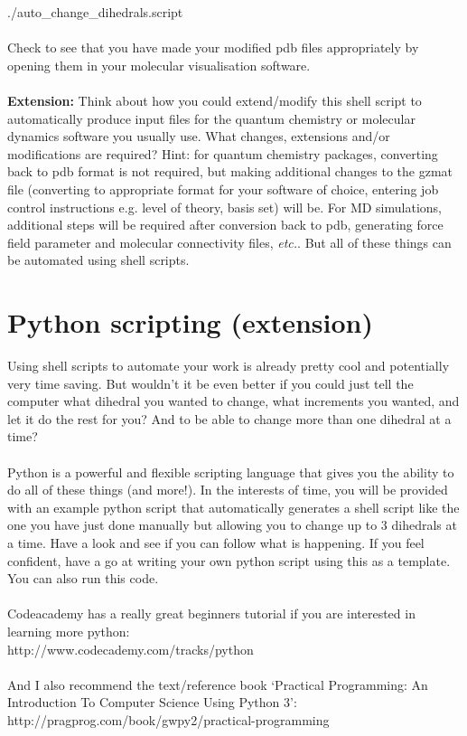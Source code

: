 \documentclass{article}
\begin{document}
./auto\_change\_dihedrals.script\\
\\
Check to see that you have made your modified pdb files appropriately by opening them in your molecular visualisation software.\\
\\
\noindent
\textbf{Extension:} Think about how you could extend/modify this shell script to automatically produce input files for the quantum chemistry or molecular dynamics software you usually use. What changes, extensions and/or modifications are required? Hint: for quantum chemistry packages, converting back to pdb format is not required, but making additional changes to the gzmat file (converting to appropriate format for your software of choice, entering job control instructions e.g. level of theory, basis set) will be. For MD simulations, additional steps will be required after conversion back to pdb, generating force field parameter and molecular connectivity files, \textit{etc.}. But all of these things can be automated using shell scripts.

\clearpage

\section{Python scripting (extension)}

Using shell scripts to automate your work is already pretty cool and potentially very time saving. But wouldn't it be even better if you could just tell the computer what dihedral you wanted to change, what increments you wanted, and let it do the rest for you? And to be able to change more than one dihedral at a time?\\
\\
\noindent
Python is a powerful and flexible scripting language that gives you the ability to do all of these things (and more!). In the interests of time, you will be provided with an example python script that automatically generates a shell script like the one you have just done manually but allowing you to change up to 3 dihedrals at a time. Have a look and see if you can follow what is happening. If you feel confident, have a go at writing your own python script using this as a template. You can also run this code.\\
\\
\noindent
Codeacademy has a really great beginners tutorial if you are interested in learning more python:\\

http://www.codecademy.com/tracks/python\\
\\
\noindent
And I also recommend the text/reference book `Practical Programming: An Introduction To Computer Science Using Python 3':\\

http://pragprog.com/book/gwpy2/practical-programming
\end{document}
